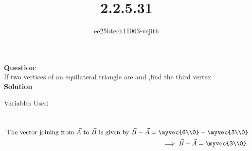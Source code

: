 \documentclass[journal]{IEEEtran}
\begin{document}

\vspace{3cm}

\title{2.2.5.31}
\author{ee25btech11063-vejith}

\maketitle
{\let\newpage\relax\maketitle}
\renewcommand{\thefigure}{\theenumi}
\renewcommand{\thetable}{\theenumi}
\setlength{\intextsep}{10pt} %
\textbf{Question}:\\
If two vertices of an equilateral triangle are  and ,find the third vertex\\
\textbf{Solution}\\
\begin{table}[h!]    
  \centering
  
  \caption{Variables Used}
  \label{}
\end{table}\\
\begin{align}
   \text{ The vector joining from }\Vec{A}\ \text{to } \Vec{B} \text{ is given by } \Vec{B}-\Vec{A}=\myvec{6\\0}-\myvec{3\\0}\\
\implies \Vec{B}-\vec{A}=\myvec{3\\0}.\\
\end{align}
\end{document}
